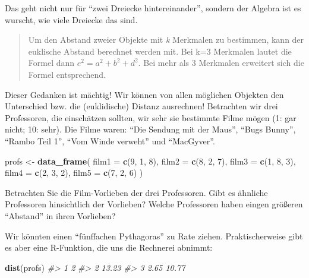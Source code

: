 \documentclass[12pt,ngerman,]{book}
\makeatletter
\newenvironment{Shaded}{\begin{snugshade}}{\end{snugshade}}
\newcommand{\KeywordTok}[1]{\textcolor[rgb]{0.13,0.29,0.53}{\textbf{{#1}}}}
\newcommand{\DataTypeTok}[1]{\textcolor[rgb]{0.13,0.29,0.53}{{#1}}}
\newcommand{\DecValTok}[1]{\textcolor[rgb]{0.00,0.00,0.81}{{#1}}}
\newcommand{\StringTok}[1]{\textcolor[rgb]{0.31,0.60,0.02}{{#1}}}
\newcommand{\CommentTok}[1]{\textcolor[rgb]{0.56,0.35,0.01}{\textit{{#1}}}}
\newcommand{\NormalTok}[1]{{#1}}
\newenvironment{kframe}{%
\medskip{}
\setlength{\fboxsep}{.8em}
 \def\at@end@of@kframe{}%
 \ifinner\ifhmode%
  \def\at@end@of@kframe{\end{minipage}}%
  \begin{minipage}{\columnwidth}%
 \fi\fi%
 \def\FrameCommand##1{\hskip\@totalleftmargin \hskip-\fboxsep
 \colorbox{shadecolor}{##1}\hskip-\fboxsep
     \hskip-\linewidth \hskip-\@totalleftmargin \hskip\columnwidth}%
 \MakeFramed {\advance\hsize-\width
   \@totalleftmargin\z@ \linewidth\hsize
   \@setminipage}}%
 {\par\unskip\endMakeFramed%
 \at@end@of@kframe}
\renewenvironment{Shaded}{\begin{kframe}}{\end{kframe}}
\makeatother
\begin{document}
Das geht nicht nur für ``zwei Dreiecke hintereinander'', sondern der
Algebra ist es wurscht, wie viele Dreiecke das sind.

\begin{quote}
Um den Abstand zweier Objekte mit \emph{k} Merkmalen zu bestimmen, kann
der euklische Abstand berechnet werden mit. Bei k=3 Merkmalen lautet die
Formel dann \(e^2 = a^2 + b^2 + d^2\). Bei mehr als 3 Merkmalen
erweitert sich die Formel entsprechend.
\end{quote}

Dieser Gedanken ist mächtig! Wir können von allen möglichen Objekten den
Unterschied bzw. die (euklidische) Distanz ausrechnen! Betrachten wir
drei Professoren, die einschätzen sollten, wir sehr sie bestimmte Filme
mögen (1: gar nicht; 10: sehr). Die Filme waren: ``Die Sendung mit der
Maus'', ``Bugs Bunny'', ``Rambo Teil 1'', ``Vom Winde verweht'' und
``MacGyver''.

\begin{Shaded}
\begin{Highlighting}[]
\NormalTok{profs <-}\StringTok{ }\KeywordTok{data_frame}\NormalTok{(}
  \DataTypeTok{film1 =} \KeywordTok{c}\NormalTok{(}\DecValTok{9}\NormalTok{, }\DecValTok{1}\NormalTok{, }\DecValTok{8}\NormalTok{),}
  \DataTypeTok{film2 =} \KeywordTok{c}\NormalTok{(}\DecValTok{8}\NormalTok{, }\DecValTok{2}\NormalTok{, }\DecValTok{7}\NormalTok{),}
  \DataTypeTok{film3 =} \KeywordTok{c}\NormalTok{(}\DecValTok{1}\NormalTok{, }\DecValTok{8}\NormalTok{, }\DecValTok{3}\NormalTok{),}
  \DataTypeTok{film4 =} \KeywordTok{c}\NormalTok{(}\DecValTok{2}\NormalTok{, }\DecValTok{3}\NormalTok{, }\DecValTok{2}\NormalTok{),}
  \DataTypeTok{film5 =} \KeywordTok{c}\NormalTok{(}\DecValTok{7}\NormalTok{, }\DecValTok{2}\NormalTok{, }\DecValTok{6}\NormalTok{)}
\NormalTok{)}
\end{Highlighting}
\end{Shaded}

Betrachten Sie die Film-Vorlieben der drei Professoren. Gibt es ähnliche
Professoren hinsichtlich der Vorlieben? Welche Professoren haben eingen
größeren ``Abstand'' in ihren Vorlieben?

Wir könnten einen ``fünffachen Pythagoras'' zu Rate ziehen.
Praktischerweise gibt es aber eine R-Funktion, die uns die Rechnerei
abnimmt:

\begin{Shaded}
\begin{Highlighting}[]
\KeywordTok{dist}\NormalTok{(profs)}
\CommentTok{#>       1     2}
\CommentTok{#> 2 13.23      }
\CommentTok{#> 3  2.65 10.77}
\end{Highlighting}
\end{Shaded}
\end{document}
